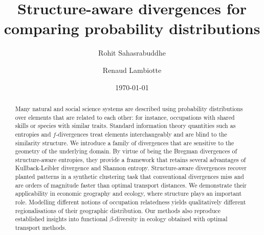 \documentclass[aps,pre,floats,floatfix,superscriptaddress,twocolumn,final,10pt]{revtex4-2}
\theoremstyle{definition}
\begin{document}
\title{Structure-aware divergences for comparing probability distributions}
\author{Rohit Sahasrabuddhe\;}

\author{Renaud Lambiotte\;}

\begin{abstract}
    Many natural and social science systems are described using probability distributions over elements that are related to each other: for instance, occupations with shared skills or species with similar traits. Standard information theory quantities such as entropies and $f$-divergences treat elements interchangeably and are blind to the similarity structure. We introduce a family of divergences that are sensitive to the geometry of the underlying domain. By virtue of being the Bregman divergences of structure-aware entropies, they provide a framework that retains several advantages of Kullback-Leibler divergence and Shannon entropy. Structure-aware divergences recover planted patterns in a synthetic clustering task that conventional divergences miss and are orders of magnitude faster than optimal transport distances. We demonstrate their applicability in economic geography and ecology, where structure plays an important role. Modelling different notions of occupation relatedness yields qualitatively different regionalisations of their geographic distribution. Our methods also reproduce established insights into functional $\beta$-diversity in ecology obtained with optimal transport methods.
\end{abstract}

\date{\today}

\maketitle
\end{document}
